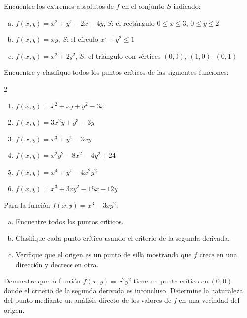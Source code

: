 \begin{prob}
Encuentre los extremos absolutos de $f$ en el conjunto $S$ indicado:
\begin{enumerate}[a)]
    \item $f(x,y) = x^2 + y^2 - 2x - 4y$, $S$: el rectángulo
    $0\leq x\leq 3$, $0\leq y\leq 2$
    \item $f(x,y) = xy$, $S$: el círculo $x^2 + y^2 \leq 1$
    \item $f(x,y) = x^2 + 2y^2$, $S$: el triángulo con vértices
    $(0,0)$, $(1,0)$, $(0,1)$
\end{enumerate}
\end{prob}

\begin{prob}
Encuentre y clasifique todos los puntos críticos de las siguientes
funciones:
\begin{multicols}{2}
\begin{enumerate}
    \item $f(x,y) = x^2 + xy + y^2 - 3x$
    \item $f(x,y) = 3x^2 y + y^3 - 3y$
    \item $f(x,y) = x^3 + y^3 - 3xy$
    \item $f(x,y) = x^2 y^2 - 8x^2 - 4y^2 + 24$
    \item $f(x,y) = x^4 + y^4 - 4x^2 y^2$
    \item $f(x,y) = x^3 + 3xy^2 - 15x - 12y$
\end{enumerate}
\end{multicols}
\end{prob}

\begin{prob}
Para la función $f(x,y) = x^3 - 3xy^2$:
\begin{enumerate}[a)]
    \item Encuentre todos los puntos críticos.
    \item Clasifique cada punto crítico usando el criterio de la segunda
    derivada.
    \item Verifique que el origen es un punto de silla mostrando que
    $f$ crece en una dirección y decrece en otra.
\end{enumerate}
\end{prob}

\begin{prob}
Demuestre que la función $f(x,y) = x^2 y^2$ tiene un punto crítico en
$(0,0)$ donde el criterio de la segunda derivada es inconcluso.
Determine la naturaleza del punto mediante un análisis directo de los
valores de $f$ en una vecindad del origen.
\end{prob}


